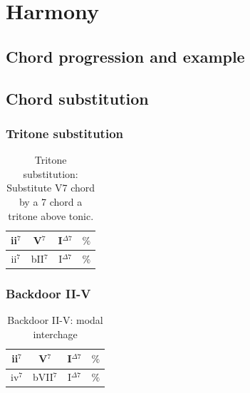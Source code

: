 \documentclass{article}
\begin{document}
\clearpage
\section{Harmony}
\subsection{Chord progression and example}



\subsection{Chord substitution}

\subsubsection{Tritone substitution}
\begin{table}[!h]
	\caption{Tritone substitution: Substitute V7 chord by a 7 chord a tritone above tonic.}
	\centering
	\begin{tabular}{| c | c | c | c |}
		\hline
		\phantom{x}ii$^7$\phantom{x} & \phantom{x}V$^7$\phantom{x} & \phantom{x}I$^{\Delta 7}$\phantom{x}  & \phantom{x}$\%$\phantom{x} \\
		\hline
		\phantom{x}ii$^7$\phantom{x} & \phantom{x}bII$^7$\phantom{x} & \phantom{x}I$^{\Delta 7}$\phantom{x}  & \phantom{x}$\%$\phantom{x} \\
		\hline
	\end{tabular}
	\label{tab:tritone-subs }
\end{table}

\subsubsection{Backdoor II-V}
\begin{table}[!h]
	\caption{Backdoor II-V: modal interchage}
	\centering
	\begin{tabular}{| c | c | c | c |}
		\hline
		\phantom{x}ii$^7$\phantom{x} & \phantom{x}V$^7$\phantom{x} & \phantom{x}I$^{\Delta 7}$\phantom{x}  & \phantom{x}$\%$\phantom{x} \\
		\hline
		\phantom{x}iv$^7$\phantom{x} & \phantom{x}bVII$^7$\phantom{x} & \phantom{x}I$^{\Delta 7}$\phantom{x}  & \phantom{x}$\%$\phantom{x} \\
		\hline
	\end{tabular}
	\label{tab: }
\end{table}
\end{document}
